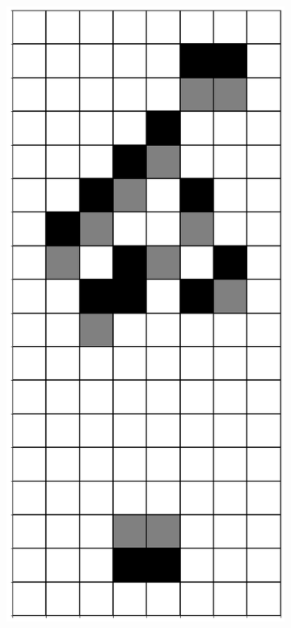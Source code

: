 \documentclass[12pt]{article}
\numberwithin{figure}{section} %
\begin{document}
\begin{figure}[H]
\begin{subfigure}{0.19\textwidth}
     		\subcaption{}
   	\end{subfigure}
       	\begin{subfigure}{0.19\textwidth}
     		\centering
     		\includegraphics[width=\linewidth]{Section4/27.4}

\end{subfigure}
\end{figure}
\end{document}
